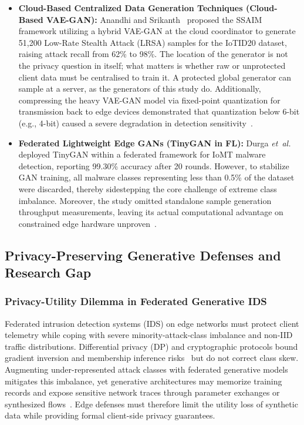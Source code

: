 \begin{itemize}
    \item \textbf{Cloud-Based Centralized Data Generation Techniques (Cloud-Based VAE-GAN):} Anandhi and Srikanth~\cite{anandhi2026} proposed the SSAIM framework utilizing a hybrid VAE-GAN at the cloud coordinator to generate 51,200 Low-Rate Stealth Attack (LRSA) samples for the IoTID20 dataset, raising attack recall from 62\% to 98\%. The location of the generator is not the privacy question in itself; what matters is whether raw or unprotected client data must be centralised to train it. A protected global generator can sample at a server, as the generators of this study do. Additionally, compressing the heavy VAE-GAN model via fixed-point quantization for transmission back to edge devices demonstrated that quantization below 6-bit (e.g., 4-bit) caused a severe degradation in detection sensitivity~\cite{anandhi2026}.
    \item \textbf{Federated Lightweight Edge GANs (TinyGAN in FL):} Durga \textit{et~al.}~\cite{durga2026} deployed TinyGAN within a federated framework for IoMT malware detection, reporting 99.30\% accuracy after 20 rounds. However, to stabilize GAN training, all malware classes representing less than 0.5\% of the dataset were discarded, thereby sidestepping the core challenge of extreme class imbalance. Moreover, the study omitted standalone sample generation throughput measurements, leaving its actual computational advantage on constrained edge hardware unproven~\cite{durga2026}.
\end{itemize}

\subsection{Privacy-Preserving Generative Defenses and Research Gap}\label{subsec:review_gap}

\subsubsection*{Privacy-Utility Dilemma in Federated Generative IDS}
Federated intrusion detection systems (IDS) on edge networks must protect client telemetry while coping with severe minority-attack-class imbalance and non-IID traffic distributions. Differential privacy (DP) and cryptographic protocols bound gradient inversion and membership inference risks~\cite{cunhaneto2023} but do not correct class skew. Augmenting under-represented attack classes with federated generative models mitigates this imbalance, yet generative architectures may memorize training records and expose sensitive network traces through parameter exchanges or synthesized flows~\cite{cunhaneto2023}. Edge defenses must therefore limit the utility loss of synthetic data while providing formal client-side privacy guarantees.

